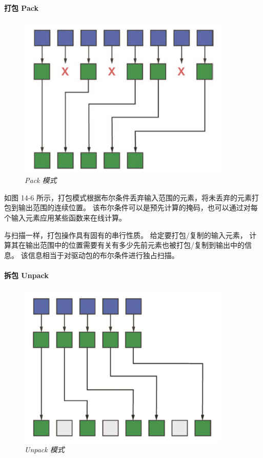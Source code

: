 \paragraph{打包 Pack}

\begin{figure}[H]
	\centering
	\includegraphics[width=0.9\textwidth]{figs/F14.6.png}
	\caption{\textit{Pack 模式 }}
\end{figure}

如图 14-6 所示，打包模式根据布尔条件丢弃输入范围的元素，将未丢弃的元素打包到输出范围的连续位置。 
该布尔条件可以是预先计算的掩码，也可以通过对每个输入元素应用某些函数来在线计算。

与扫描一样，打包操作具有固有的串行性质。 给定要打包/复制的输入元素，
计算其在输出范围中的位置需要有关有多少先前元素也被打包/复制到输出中的信息。 
该信息相当于对驱动包的布尔条件进行独占扫描。

\paragraph{拆包 Unpack}

\begin{figure}[H]
	\centering
	\includegraphics[width=0.9\textwidth]{figs/F14.7.png}
	\caption{\textit{Unpack 模式 }}
\end{figure}

